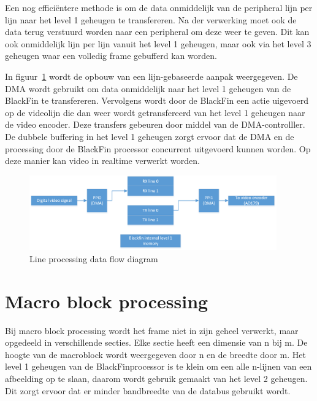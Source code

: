 		\par Een nog effici\"entere methode is om de data onmiddelijk van de peripheral lijn per lijn naar het level 1 geheugen te transfereren. Na der verwerking moet ook de data terug verstuurd worden naar een peripheral om deze weer te geven. Dit kan ook onmiddelijk lijn per lijn vanuit het level 1 geheugen, maar ook via het level 3 geheugen waar een volledig frame gebufferd kan worden. 

		\par In figuur~\ref{fig:line_processing} wordt de opbouw van een lijn-gebaseerde aanpak weergegeven. De DMA wordt gebruikt om data onmiddelijk naar het level 1 geheugen van de BlackFin te transfereren. Vervolgens wordt door de BlackFin een actie uigevoerd op de videolijn die dan weer wordt getransfereerd van het level 1 geheugen naar de video encoder. Deze transfers gebeuren door middel van de DMA-controlller. De dubbele buffering in het level 1 geheugen zorgt ervoor dat de DMA en de processing door de BlackFin processor concurrent uitgevoerd kunnen worden. Op deze manier kan video in realtime verwerkt worden.

			\begin{figure}[H]
				\centering
				\includegraphics[width=0.95\textwidth]{Chapters/Chapter4/Images/DMA_line_processing.png}
				\caption{Line processing data flow diagram}
				\label{fig:line_processing}
			\end{figure}
	\newpage
	\section{Macro block processing}
		
		\par Bij macro block processing wordt het frame niet in zijn geheel verwerkt, maar opgedeeld in verschillende secties. Elke sectie heeft een dimensie van n bij m. De hoogte van de macroblock wordt weergegeven door n en de breedte door m. Het level 1 geheugen van de BlackFinprocessor is te klein om een alle n-lijnen van een afbeelding op te slaan, daarom wordt gebruik gemaakt van het level 2 geheugen. Dit zorgt ervoor dat er minder bandbreedte van de databus gebruikt wordt. 

